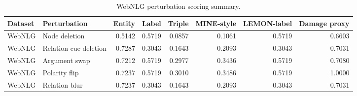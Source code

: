 \begin{table}[t]
\centering
\caption{WebNLG perturbation scoring summary.}
\label{tab:webnlg-final}
\scriptsize
\begin{tabular}{llrrrrrr}
\toprule
Dataset & Perturbation & Entity & Label & Triple & MINE-style & LEMON-label & Damage proxy \\
\midrule
WebNLG & Node deletion & 0.5142 & 0.5719 & 0.0857 & 0.1061 & 0.5719 & 0.6603 \\
WebNLG & Relation cue deletion & 0.7287 & 0.3043 & 0.1643 & 0.2093 & 0.3043 & 0.7031 \\
WebNLG & Argument swap & 0.7212 & 0.5719 & 0.2977 & 0.3436 & 0.5719 & 0.7080 \\
WebNLG & Polarity flip & 0.7237 & 0.5719 & 0.3010 & 0.3486 & 0.5719 & 1.0000 \\
WebNLG & Relation blur & 0.7237 & 0.3043 & 0.1643 & 0.2093 & 0.3043 & 0.7031 \\
\bottomrule
\end{tabular}
\end{table}
